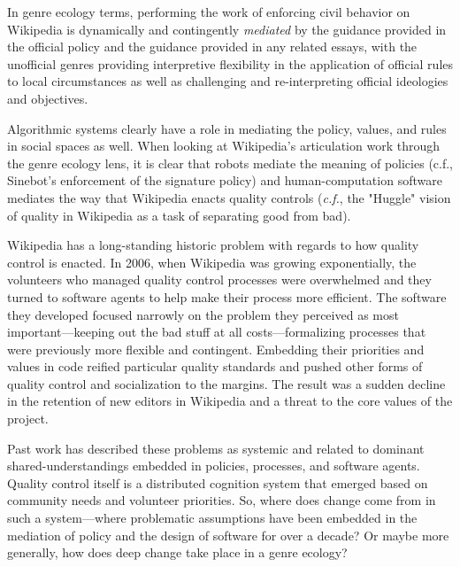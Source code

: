 In genre ecology terms, performing the work of enforcing civil behavior on Wikipedia is dynamically and contingently \emph{mediated} by the guidance provided in the official policy and the guidance provided in any related essays, with the unofficial genres providing interpretive flexibility in the application of official rules to local circumstances as well as challenging and re-interpreting official ideologies and objectives.

Algorithmic systems clearly have a role in mediating the policy, values, and rules in social spaces as well\cite{lessig1999code}.  When looking at Wikipedia's articulation work through the genre ecology lens, it is clear that robots mediate the meaning of policies (c.f., Sinebot's enforcement of the signature policy\cite{geiger2011lives}) and human-computation software mediates the way that Wikipedia enacts quality controls (\emph{c.f.}, the "Huggle" vision of quality in Wikipedia as a task of separating good from bad\cite{halfaker2014snuggle}).

  Wikipedia has a long-standing historic problem with regards to how quality control is enacted.  In 2006, when Wikipedia was growing exponentially, the volunteers who managed quality control processes were overwhelmed and they turned to software agents to help make their process more efficient\cite{halfaker2014snuggle}.  The software they developed focused narrowly on the problem they perceived as most important---keeping out the bad stuff at all costs---formalizing processes that were previously more flexible and contingent. Embedding their priorities and values in code reified particular quality standards and pushed other forms of quality control and socialization to the margins\cite{halfaker2013rise}.  The result was a sudden decline in the retention of new editors in Wikipedia and a threat to the core values of the project.

Past work has described these problems as systemic and related to dominant shared-understandings embedded in policies, processes, and software agents\cite{halfaker2014snuggle}.  Quality control itself is a distributed cognition system that emerged based on community needs and volunteer priorities\cite{geiger2010work}.  So, where does change come from in such a system---where problematic assumptions have been embedded in the mediation of policy and the design of software for over a decade?  Or maybe more generally, how does deep change take place in a genre ecology?

